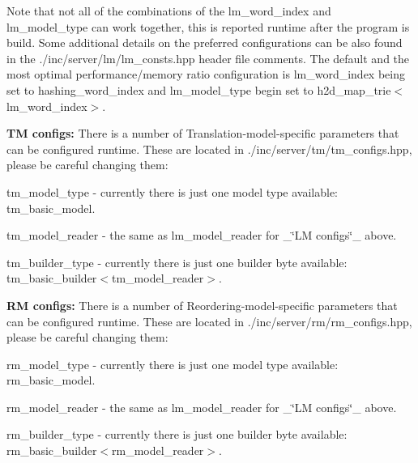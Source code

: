 Note that not all of the combinations of the {\ttfamily lm\+\_\+word\+\_\+index} and {\ttfamily lm\+\_\+model\+\_\+type} can work together, this is reported runtime after the program is build. Some additional details on the preferred configurations can be also found in the {\ttfamily ./inc/server/lm/lm\+\_\+consts.hpp} header file comments. The default and the most optimal performance/memory ratio configuration is {\ttfamily lm\+\_\+word\+\_\+index} being set to {\ttfamily hashing\+\_\+word\+\_\+index} and {\ttfamily lm\+\_\+model\+\_\+type} begin set to {\ttfamily h2d\+\_\+map\+\_\+trie$<$lm\+\_\+word\+\_\+index$>$}.

{\bfseries T\+M configs\+:} There is a number of Translation-\/model-\/specific parameters that can be configured runtime. These are located in {\ttfamily ./inc/server/tm/tm\+\_\+configs.hpp}, please be careful changing them\+:


\begin{DoxyItemize}
\item {\ttfamily tm\+\_\+model\+\_\+type} -\/ currently there is just one model type available\+: {\ttfamily tm\+\_\+basic\+\_\+model}.
\item {\ttfamily tm\+\_\+model\+\_\+reader} -\/ the same as {\ttfamily lm\+\_\+model\+\_\+reader} for \+\_\+\char`\"{}\+L\+M configs\char`\"{}\+\_\+ above.
\item {\ttfamily tm\+\_\+builder\+\_\+type} -\/ currently there is just one builder byte available\+: {\ttfamily tm\+\_\+basic\+\_\+builder$<$tm\+\_\+model\+\_\+reader$>$}.
\end{DoxyItemize}

{\bfseries R\+M configs\+:} There is a number of Reordering-\/model-\/specific parameters that can be configured runtime. These are located in {\ttfamily ./inc/server/rm/rm\+\_\+configs.hpp}, please be careful changing them\+:


\begin{DoxyItemize}
\item {\ttfamily rm\+\_\+model\+\_\+type} -\/ currently there is just one model type available\+: {\ttfamily rm\+\_\+basic\+\_\+model}.
\item {\ttfamily rm\+\_\+model\+\_\+reader} -\/ the same as {\ttfamily lm\+\_\+model\+\_\+reader} for \+\_\+\char`\"{}\+L\+M configs\char`\"{}\+\_\+ above.
\item {\ttfamily rm\+\_\+builder\+\_\+type} -\/ currently there is just one builder byte available\+: {\ttfamily rm\+\_\+basic\+\_\+builder$<$rm\+\_\+model\+\_\+reader$>$}.
\end{DoxyItemize}

